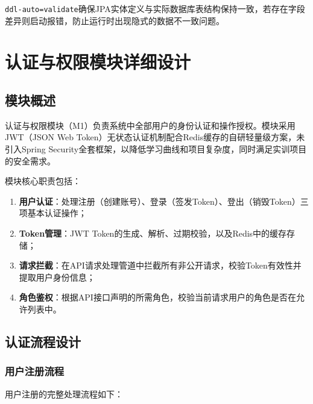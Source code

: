 \documentclass{../../softeng}
\begin{document}
\verb|ddl-auto=validate|确保JPA实体定义与实际数据库表结构保持一致，若存在字段差异则启动报错，防止运行时出现隐式的数据不一致问题。

\section{认证与权限模块详细设计}

\subsection{模块概述}

认证与权限模块（M1）负责系统中全部用户的身份认证和操作授权。模块采用JWT（JSON Web Token）无状态认证机制配合Redis缓存的自研轻量级方案，未引入Spring Security全套框架，以降低学习曲线和项目复杂度，同时满足实训项目的安全需求。

模块核心职责包括：
\begin{enumerate}
    \item \textbf{用户认证}：处理注册（创建账号）、登录（签发Token）、登出（销毁Token）三项基本认证操作；
    \item \textbf{Token管理}：JWT Token的生成、解析、过期校验，以及Redis中的缓存存储；
    \item \textbf{请求拦截}：在API请求处理管道中拦截所有非公开请求，校验Token有效性并提取用户身份信息；
    \item \textbf{角色鉴权}：根据API接口声明的所需角色，校验当前请求用户的角色是否在允许列表中。
\end{enumerate}

\subsection{认证流程设计}

\subsubsection{用户注册流程}

用户注册的完整处理流程如下：
\end{document}
